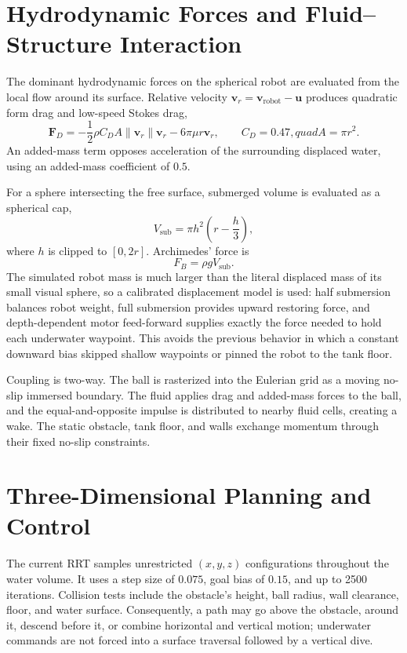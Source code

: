 \documentclass[12pt]{article}
\begin{document}
\section{Hydrodynamic Forces and Fluid--Structure Interaction}

The dominant hydrodynamic forces on the spherical robot are evaluated from the
local flow around its surface.  Relative velocity
\(\mathbf{v}_r=\mathbf{v}_{\mathrm{robot}}-\mathbf{u}\) produces quadratic
form drag and low-speed Stokes drag,
\[
\mathbf{F}_{D}
=-\frac{1}{2}\rho C_D A\lVert\mathbf{v}_r\rVert\mathbf{v}_r
-6\pi\mu r\mathbf{v}_r,
\qquad C_D=0.47,quad A=\pi r^2.
\]
An added-mass term opposes acceleration of the surrounding displaced water,
using an added-mass coefficient of \(0.5\).

For a sphere intersecting the free surface, submerged volume is evaluated as a
spherical cap,
\[
V_{\mathrm{sub}}=\pi h^2\left(r-\frac{h}{3}\right),
\]
where \(h\) is clipped to \([0,2r]\).  Archimedes' force is
\[
F_B=\rho gV_{\mathrm{sub}}.
\]
The simulated robot mass is much larger than the literal displaced mass of its
small visual sphere, so a calibrated displacement model is used: half
submersion balances robot weight, full submersion provides upward restoring
force, and depth-dependent motor feed-forward supplies exactly the force needed
to hold each underwater waypoint.  This avoids the previous behavior in which
a constant downward bias skipped shallow waypoints or pinned the robot to the
tank floor.

Coupling is two-way.  The ball is rasterized into the Eulerian grid as a moving
no-slip immersed boundary.  The fluid applies drag and added-mass forces to the
ball, and the equal-and-opposite impulse is distributed to nearby fluid cells,
creating a wake.  The static obstacle, tank floor, and walls exchange momentum
through their fixed no-slip constraints.

\section{Three-Dimensional Planning and Control}

The current RRT samples unrestricted \((x,y,z)\) configurations throughout the
water volume.  It uses a step size of \(0.075\), goal bias of \(0.15\), and up
to 2500 iterations.  Collision tests include the obstacle's height, ball
radius, wall clearance, floor, and water surface.  Consequently, a path may go
above the obstacle, around it, descend before it, or combine horizontal and
vertical motion; underwater commands are not forced into a surface traversal
followed by a vertical dive.
\end{document}
